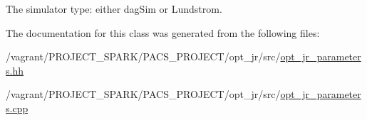 The simulator type\-: either dag\-Sim or Lundstrom. 



The documentation for this class was generated from the following files\-:\begin{DoxyCompactItemize}
\item 
/vagrant/\-P\-R\-O\-J\-E\-C\-T\-\_\-\-S\-P\-A\-R\-K/\-P\-A\-C\-S\-\_\-\-P\-R\-O\-J\-E\-C\-T/opt\-\_\-jr/src/\hyperlink{opt__jr__parameters_8hh}{opt\-\_\-jr\-\_\-parameters.\-hh}\item 
/vagrant/\-P\-R\-O\-J\-E\-C\-T\-\_\-\-S\-P\-A\-R\-K/\-P\-A\-C\-S\-\_\-\-P\-R\-O\-J\-E\-C\-T/opt\-\_\-jr/src/\hyperlink{opt__jr__parameters_8cpp}{opt\-\_\-jr\-\_\-parameters.\-cpp}\end{DoxyCompactItemize}
